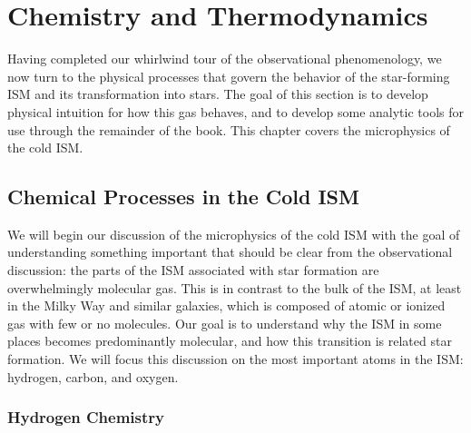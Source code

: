 \chapter{Chemistry and Thermodynamics}
\label{ch:microphysics}


Having completed our whirlwind tour of the observational phenomenology, we now turn to the physical processes that govern the behavior of the star-forming ISM and its transformation into stars. The goal of this section is to develop physical intuition for how this gas behaves, and to develop some analytic tools for use through the remainder of the book. This chapter covers the microphysics of the cold ISM.

\section{Chemical Processes in the Cold ISM}

We will begin our discussion of the microphysics of the cold ISM with the goal of understanding something important that should be clear from the observational discussion: the parts of the ISM associated with star formation are overwhelmingly molecular gas. This is in contrast to the bulk of the ISM, at least in the Milky Way and similar galaxies, which is composed of atomic or ionized gas with few or no molecules. Our goal is to understand why the ISM in some places becomes predominantly molecular, and how this transition is related star formation. We will focus this discussion on the most important atoms in the ISM: hydrogen, carbon, and oxygen.

\subsection{Hydrogen Chemistry}
\label{ssec:Hchemistry}

